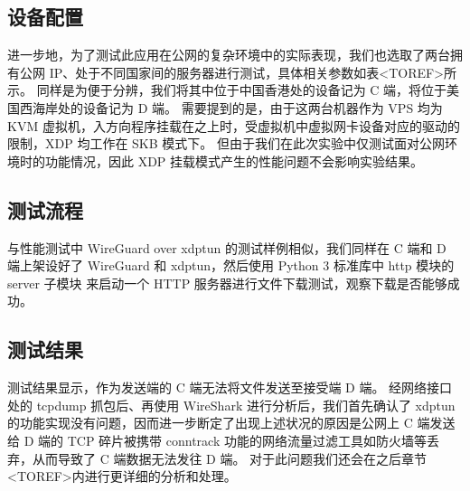 \subsection{设备配置}

进一步地，为了测试此应用在公网的复杂环境中的实际表现，我们也选取了两台拥有公网 IP、处于不同国家间的服务器进行测试，具体相关参数如表<TOREF>所示。
同样是为便于分辨，我们将其中位于中国香港处的设备记为 C 端，将位于美国西海岸处的设备记为 D 端。
需要提到的是，由于这两台机器作为 VPS 均为 KVM 虚拟机，入方向程序挂载在之上时，受虚拟机中虚拟网卡设备对应的驱动的限制，XDP 均工作在 SKB 模式下。
但由于我们在此次实验中仅测试面对公网环境时的功能情况，因此 XDP 挂载模式产生的性能问题不会影响实验结果。

\subsection{测试流程}

与性能测试中 WireGuard over xdptun 的测试样例相似，我们同样在 C 端和 D 端上架设好了 WireGuard 和 xdptun，然后使用 Python 3 标准库中 http 模块的 server 子模块 来启动一个 HTTP 服务器进行文件下载测试，观察下载是否能够成功。

\subsection{测试结果}

测试结果显示，作为发送端的 C 端无法将文件发送至接受端 D 端。
经网络接口处的 tcpdump 抓包后、再使用 WireShark 进行分析后，我们首先确认了 xdptun 的功能实现没有问题，因而进一步断定了出现上述状况的原因是公网上 C 端发送给 D 端的 TCP 碎片被携带 conntrack 功能的网络流量过滤工具如防火墙等丢弃，从而导致了 C 端数据无法发往 D 端。
对于此问题我们还会在之后章节<TOREF>内进行更详细的分析和处理。
